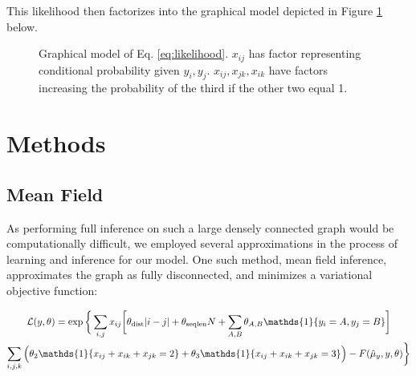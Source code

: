 \documentclass{article}
\begin{document}
This likelihood then factorizes into the graphical model depicted in Figure \ref{fig:model} below.
\begin{figure}
\centering
{}
\caption{Graphical model of Eq. \ref{eq:likelihood}. $x_{ij}$ has factor representing conditional probability given $y_i, y_j$. $x_{ij}, x_{jk}, x_{ik}$ have factors increasing the probability of the third if the other two equal 1.}
\label{fig:model}
\end{figure}

\section{Methods}
\subsection{Mean Field}
As performing full inference on such a large densely connected graph would be computationally difficult, we employed several approximations in the process of learning and inference for our model. One such method, mean field inference, approximates the graph as fully disconnected, and minimizes a variational objective function:

\begin{multline} \label{eq:mflikelihood}
\mathcal{L}(y, \theta) = \exp\bigg\{\sum_{i, j} x_{ij}\bigg[\theta_{\textmd{dist}}|i - j|+ \theta_{\textmd{seqlen}}N + \sum_{A, B} \theta_{A, B}\mathds{1}\{y_i = A, y_j = B\}\bigg] \\
\sum_{i, j, k}\Big(\theta_2\mathds{1}\{x_{ij} + x_{ik} + x_{jk} = 2\} + \theta_3\mathds{1}\{x_{ij} + x_{ik} + x_{jk} = 3\}\Big)  - F(\hat{\mu}_{y}, y, \theta) \bigg\}
\end{multline}
\end{document}

